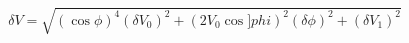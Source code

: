 \begin{equation}
\label{eq:delta_V_Malus}
\delta V = \sqrt{ \left(\cos{\phi}\right)^4(\delta V_0)^2 + \left(2V_0 \cos{]phi} \right)^2(\delta \phi)^2+ (\delta V_1)^2}
\end{equation}